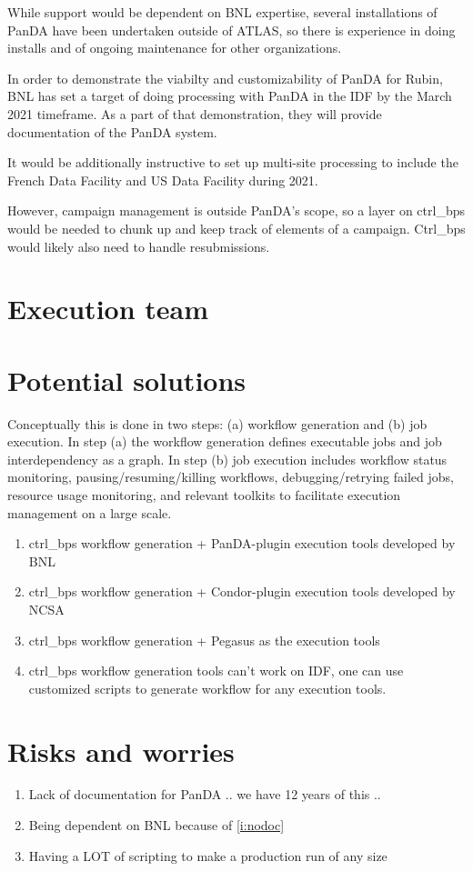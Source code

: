 While support would be dependent on BNL expertise, several
installations of PanDA have been undertaken outside of ATLAS, so there
is experience in doing installs and of ongoing maintenance for other
organizations.

In order to demonstrate the viabilty and customizability of PanDA for
Rubin, BNL has set a target of doing processing with PanDA in the IDF
by the March 2021 timeframe. As a part of that demonstration, they
will provide documentation of the PanDA system.

It would be additionally instructive to set up multi-site processing
to include the French Data Facility and US Data Facility during 2021.

However, campaign management is outside PanDA’s scope, so a layer on ctrl\_bps would be needed to chunk up and keep track of elements of a campaign. Ctrl\_bps would likely also need to handle resubmissions.


\section {Execution team }


\section {Potential solutions} \label{sec:potential}

Conceptually this is done in two steps: (a) workflow generation and (b) job execution.
In step (a) the workflow generation defines executable jobs and job interdependency as a graph.
In step (b) job execution includes workflow status monitoring, pausing/resuming/killing workflows, debugging/retrying failed jobs, resource usage monitoring, and relevant toolkits to facilitate execution management on a large scale.
\begin{enumerate}
\item  ctrl\_bps workflow generation + PanDA-plugin execution tools developed by BNL
\item ctrl\_bps workflow generation + Condor-plugin execution tools developed by NCSA
\item ctrl\_bps workflow generation + Pegasus as the execution tools
\item ctrl\_bps workflow generation tools can't work on IDF, one can use customized scripts to generate workflow for any execution tools.
\end{enumerate}



\section {Risks and worries}

\begin{enumerate}
\item Lack of documentation for PanDA .. we have 12 years of this ..\label{i:nodoc}
\item Being dependent on BNL because of \ref{i:nodoc}
\item Having a LOT of scripting to make a production run of any size
\end{enumerate}
